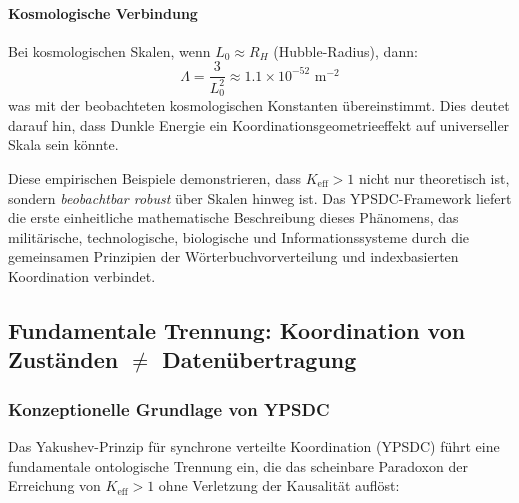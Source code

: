 \documentclass[11pt,a4paper]{article}
\begin{document}
	\paragraph{Kosmologische Verbindung}
	Bei kosmologischen Skalen, wenn $L_0 \approx R_H$ (Hubble-Radius), dann:
	\begin{equation}
		\Lambda = \frac{3}{L_0^2} \approx 1.1 \times 10^{-52} \text{ m}^{-2}
	\end{equation}
	was mit der beobachteten kosmologischen Konstanten übereinstimmt. Dies deutet darauf hin, dass Dunkle Energie ein Koordinationsgeometrieeffekt auf universeller Skala sein könnte.
	
	Diese empirischen Beispiele demonstrieren, dass $K_{\mathrm{eff}} > 1$ nicht nur theoretisch ist, sondern \emph{beobachtbar robust} über Skalen hinweg ist. Das YPSDC-Framework liefert die erste einheitliche mathematische Beschreibung dieses Phänomens, das militärische, technologische, biologische und Informationssysteme durch die gemeinsamen Prinzipien der Wörterbuchvorverteilung und indexbasierten Koordination verbindet.
	
	
	\subsection{Fundamentale Trennung: Koordination von Zuständen $\neq$ Datenübertragung}
	\label{subsec:coordination-vs-data}
	
	\subsubsection{Konzeptionelle Grundlage von YPSDC}
	
	Das Yakushev-Prinzip für synchrone verteilte Koordination (YPSDC) führt eine fundamentale ontologische Trennung ein, die das scheinbare Paradoxon der Erreichung von $K_{\mathrm{eff}} > 1$ ohne Verletzung der Kausalität auflöst:
	
\end{document}
